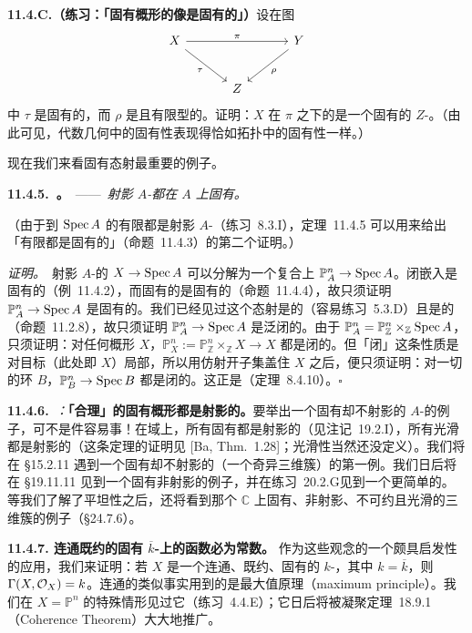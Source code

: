 \textbf{11.4.C.（练习：「固有概形的像是固有的」）}\quad 设在图
\[
\begin{tikzcd}[row sep=2.4em, column sep=3.2em]
X \ar[rr, "\pi"] \ar[dr, "\tau"'] & & Y \ar[dl, "\rho"] \\
& Z &
\end{tikzcd}
\]
中 $\tau$ 是固有的，而 $\rho$ 是\trSeparated{}且有限型的。证明：$X$ 在 $\pi$ 之下的\trSchemeTheoreticImage{}是一个固有的 $Z$-\trScheme。（由此可见，代数几何中的固有性表现得恰如拓扑中的固有性一样。）

现在我们来看固有态射最重要的例子。

\textbf{11.4.5.\ \trhTheorem{}。}\ ——\ \emph{射影 $A$-\trScheme{}都在 $A$ 上固有。}

（由于到 $\operatorname{Spec} A$ 的有限\trMorphism{}都是射影 $A$-\trScheme{}（\mbox{练习~8.3.I}），定理~11.4.5 可以用来给出「有限\trMorphism{}都是固有的」（命题~11.4.3）的第二个证明。）

\emph{证明。}\ 射影 $A$-\trScheme{}的\trStructureMorphism{} $X\to\operatorname{Spec} A$ 可以分解为一个\trClosedEmbedding{}复合上 $\mathbb{P}^n_A\to\operatorname{Spec} A$。闭嵌入是固有的（例~11.4.2），而固有\trMorphism{}的\trComposition{}是固有的（命题~11.4.4），故只须证明 $\mathbb{P}^n_A\to\operatorname{Spec} A$ 是固有的。我们已经见过这个态射是\trFiniteType{}的（容易练习~5.3.D）且是\trSeparated{}的（命题~11.2.8），故只须证明 $\mathbb{P}^n_A\to\operatorname{Spec} A$ 是泛闭的。由于 $\mathbb{P}^n_A=\mathbb{P}^n_{\mathbb{Z}}\times_{\mathbb{Z}}\operatorname{Spec} A$，只须证明：对任何概形 $X$，$\mathbb{P}^n_X:=\mathbb{P}^n_{\mathbb{Z}}\times_{\mathbb{Z}}X\to X$ 都是闭的。但「闭」这条性质是对目标（此处即 $X$）局部，所以用仿射开子集盖住 $X$ 之后，便只须证明：对一切的环 $B$，$\mathbb{P}^n_B\to\operatorname{Spec} B$ 都是闭的。这正是\trFundamentalTheoremOfEliminationTheory（定理~8.4.10）。\hfill$\square$

\textbf{11.4.6.}\ \emph{\trhRemark{}：}\textbf{「合理」的固有概形都是射影的。}\quad 要举出一个固有却不射影的 $A$-\trScheme{}的例子，可不是件容易事！在域上，所有固有\trCurve{}都是射影的（见注记~19.2.I），所有光滑\trSurface{}都是射影的（\trZariski{}这条定理的证明见 [Ba, Thm.~1.28]；光滑性当然还没定义）。我们将在 \S15.2.11 遇到一个固有却不射影的\trVariety{}（一个奇异三维簇）的第一例。我们日后将在 \S19.11.11 见到一个固有非射影\trSurface{}的例子，并在\mbox{练习~20.2.G}见到一个更简单的。等我们了解了平坦性之后，还将看到\trHironaka{}那个 $\mathbb{C}$ 上固有、非射影、不可约且光滑的三维簇的例子（\S24.7.6）。

\textbf{11.4.7. 连通既约的固有 $\overline{k}$-\trScheme{}上的函数必为常数。}\quad
作为这些观念的一个颇具启发性的应用，我们来证明：若 $X$ 是一个连通、既约、固有的 $k$-\trScheme{}，其中 $k=\overline{k}$，则 $\Gamma(X,\mathcal{O}_X)=k$。连通\trCompact{}\trComplex\trManifold{}的类似事实用到的是最大值原理（maximum principle）。我们在 $X=\mathbb{P}^n$ 的特殊情形见过它（\mbox{练习~4.4.E}）；它日后将被\trGrothendieck{}凝聚定理~18.9.1（Coherence Theorem）大大地推广。


